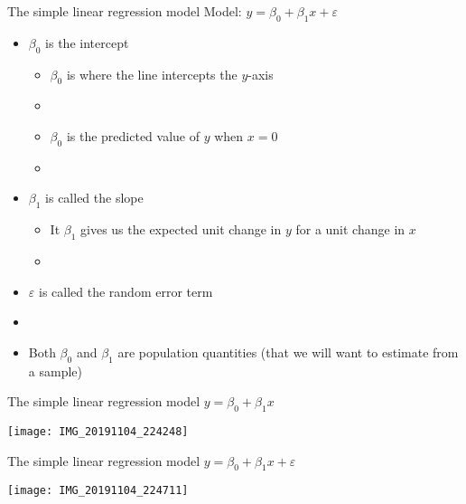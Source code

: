 \documentclass[xcolor=dvipsnames]{beamer}
\begin{document}
\begin{frame}{The simple linear regression model}
Model: $y = \beta_0 + \beta_1 x + \varepsilon$ \pause
		\begin{itemize}
			\item $\beta_0$ is the intercept \pause
			\begin{itemize}
				\item $\beta_0$ is where the line intercepts the $y$-axis \pause
				\item[]
				\item $\beta_0$ is the predicted value of $y$ when $x=0$ \pause
				\item[]
			\end{itemize} 
			\item $\beta_1$ is called the slope \pause
			\begin{itemize}
				\item It $\beta_1$ gives us the expected unit change in $y$ for a unit change in $x$ \pause
				\item[]
			\end{itemize}
			\item $\varepsilon$ is called the random error term \pause
			\item[]
			\item Both $\beta_0$ and $\beta_1$ are population quantities (that we will want to estimate from a sample)
		\end{itemize}
\end{frame}

\begin{frame}{The simple linear regression model}
$y = \beta_0 + \beta_1 x $
	\begin{center}
		\texttt{[image: IMG\_20191104\_224248]}
	\end{center}
\end{frame}

\begin{frame}{The simple linear regression model}
$y = \beta_0 + \beta_1 x + \varepsilon$
\begin{center}
	\texttt{[image: IMG\_20191104\_224711]}
\end{center}
\end{frame}
\end{document}
